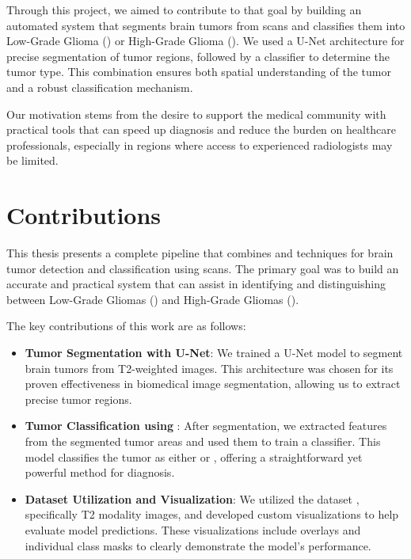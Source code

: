 Through this project, we aimed to contribute to that goal by building an automated system that segments brain tumors from  scans and classifies them into Low-Grade Glioma () or High-Grade Glioma (). We used a U-Net architecture for precise segmentation of tumor regions, followed by a  classifier to determine the tumor type. This combination ensures both spatial understanding of the tumor and a robust classification mechanism.

Our motivation stems from the desire to support the medical community with practical  tools that can speed up diagnosis and reduce the burden on healthcare professionals, especially in regions where access to experienced radiologists may be limited.

\section{ Contributions }

This thesis presents a complete pipeline that combines  and  techniques for brain tumor detection and classification using  scans. The primary goal was to build an accurate and practical system that can assist in identifying and distinguishing between Low-Grade Gliomas () and High-Grade Gliomas ().

The key contributions of this work are as follows:

\begin{itemize}
	\item \textbf{Tumor Segmentation with U-Net}: We  trained a U-Net model to segment brain tumors from T2-weighted  images. This architecture was chosen for its proven effectiveness in biomedical image segmentation, allowing us to extract precise tumor regions. \cite{ronneberger2015u}
	\item \textbf{Tumor Classification using }: After segmentation, we extracted features from the segmented tumor areas and used them to train a  classifier. This model classifies the tumor as either  or , offering a straightforward yet powerful method for diagnosis.
	\item \textbf{Dataset Utilization and Visualization}: We utilized the  dataset \cite{brats2020}, specifically T2 modality images, and developed custom visualizations to help evaluate model predictions. These visualizations include overlays and individual class masks to clearly demonstrate the model's performance.
\end{itemize}
